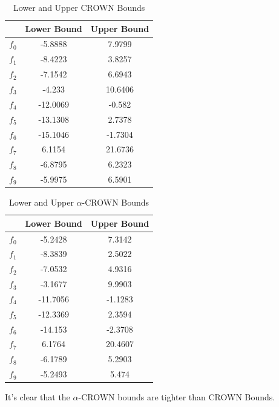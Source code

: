 \documentclass[12pt]{article}
\begin{document}
\begin{enumerate}[1.]
\begin{minipage}[l]{0.48\linewidth}
	\begin{table}[H]
		\centering
		\caption{Lower and Upper CROWN Bounds}
		\begin{tabular}{ccc}
			\toprule
			& Lower Bound & Upper Bound \\
			\midrule
			$f_0$ & -5.8888 & 7.9799 \\
			$f_1$ & -8.4223 & 3.8257 \\
			$f_2$ & -7.1542 & 6.6943 \\
			$f_3$ & -4.233 & 10.6406 \\
			$f_4$ & -12.0069 & -0.582 \\
			$f_5$ & -13.1308 & 2.7378 \\
			$f_6$ & -15.1046 & -1.7304 \\
			$f_7$ & 6.1154 & 21.6736 \\
			$f_8$ & -6.8795 & 6.2323 \\
			$f_9$ & -5.9975 & 6.5901 \\
			\bottomrule
		\end{tabular}
		\label{tab:CROWN}
	\end{table}
\end{minipage}
\begin{minipage}[r]{0.48\linewidth}
	\begin{table}[H]
		\centering
		\caption{Lower and Upper $\alpha$-CROWN Bounds}
		\begin{tabular}{ccc}
			\toprule
			& Lower Bound & Upper Bound \\
			\midrule
			$f_0$ & -5.2428 & 7.3142 \\
			$f_1$ & -8.3839 & 2.5022 \\
			$f_2$ & -7.0532 & 4.9316 \\
			$f_3$ & -3.1677 & 9.9903 \\
			$f_4$ & -11.7056 & -1.1283 \\
			$f_5$ & -12.3369 & 2.3594 \\
			$f_6$ & -14.153 & -2.3708 \\
			$f_7$ & 6.1764 & 20.4607 \\
			$f_8$ & -6.1789 & 5.2903 \\
			$f_9$ & -5.2493 & 5.474 \\
			\bottomrule
		\end{tabular}
		\label{tab:alpha_CROWN}
	\end{table}	
\end{minipage}	

It's clear that the $\alpha$-CROWN bounds are tighter than CROWN Bounds.
\end{enumerate}
\end{document}
